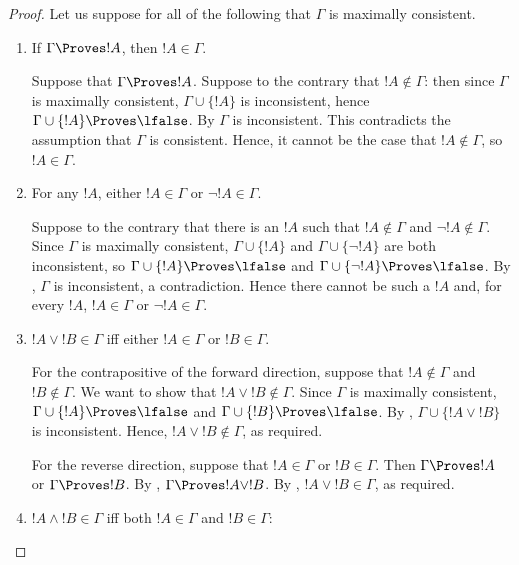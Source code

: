 \documentclass[../../include/open-logic-section]{subfiles}
\begin{document}
\begin{proof}
Let us suppose for all of the following that $\Gamma$ is maximally
consistent.
\begin{enumerate}
\item If $\Gamma \Proves !A$, then $!A \in \Gamma$.

Suppose that $\Gamma \Proves !A$. Suppose to the contrary that $!A
\notin \Gamma$: then since $\Gamma$ is maximally consistent, $\Gamma
\cup \{!A\}$ is inconsistent, hence $\Gamma \cup \{!A\} \Proves
\lfalse$.  By
$\Gamma$ is inconsistent. This contradicts the assumption that
$\Gamma$ is consistent. Hence, it cannot be the case that $!A \notin
\Gamma$, so $!A \in \Gamma$.

\item For any $!A$, either $!A \in \Gamma$ or $\lnot !A \in \Gamma$.

Suppose to the contrary that there is an $!A$ such that $!A \notin
\Gamma$ and $\lnot !A \notin \Gamma$. Since $\Gamma$ is maximally
consistent, $\Gamma \cup \{!A\}$ and $\Gamma \cup \{\lnot !A\}$ are
both inconsistent, so $\Gamma \cup \{!A\} \Proves \lfalse$ and $\Gamma
\cup \{\lnot !A\} \Proves \lfalse$. By
,
$\Gamma$ is inconsistent, a contradiction.  Hence there cannot be such
a $!A$ and, for every $!A$, $!A \in \Gamma$ or $\lnot !A \in \Gamma$.

\item $!A \lor !B \in \Gamma$ iff either $!A \in \Gamma$ or $!B \in
  \Gamma$.

For the contrapositive of the forward direction, suppose that $!A
\notin \Gamma$ and $!B \notin \Gamma$. We want to show that $!A \lor
!B \notin \Gamma$. Since $\Gamma$ is maximally consistent, $\Gamma
\cup \{!A\} \Proves \lfalse$ and $\Gamma \cup \{!B\} \Proves \lfalse$.
By
,
$\Gamma \cup \{!A \lor !B\}$ is inconsistent. Hence, $!A \lor !B
\notin \Gamma$, as required.

For the reverse direction, suppose that $!A \in \Gamma$ or $!B \in
\Gamma$. Then $\Gamma \Proves !A$ or $\Gamma \Proves !B$. By
,
$\Gamma \Proves !A \lor !B$.  By , $!A \lor !B
\in \Gamma$, as required.

\item $!A \land !B \in \Gamma$ iff both $!A \in \Gamma$ and $!B \in
  \Gamma$:


\end{enumerate}
\end{proof}
\end{document}
